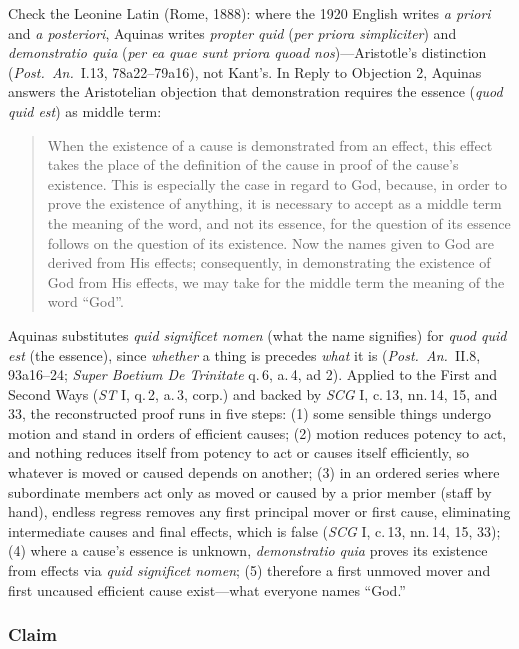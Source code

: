 Check the Leonine Latin (Rome, 1888): where the 1920 English writes \emph{a priori} and \emph{a posteriori}, Aquinas writes \emph{propter quid} (\emph{per priora simpliciter}) and \emph{demonstratio quia} (\emph{per ea quae sunt priora quoad nos})---Aristotle's distinction (\emph{Post.\ An.}\ I.13, 78a22--79a16), not Kant's. In Reply to Objection 2, Aquinas answers the Aristotelian objection that demonstration requires the essence (\emph{quod quid est}) as middle term:

\begin{quote}
When the existence of a cause is demonstrated from an effect, this effect takes the place of the definition of the cause in proof of the cause's existence. This is especially the case in regard to God, because, in order to prove the existence of anything, it is necessary to accept as a middle term the meaning of the word, and not its essence, for the question of its essence follows on the question of its existence. Now the names given to God are derived from His effects; consequently, in demonstrating the existence of God from His effects, we may take for the middle term the meaning of the word ``God''.
\end{quote}

Aquinas substitutes \emph{quid significet nomen} (what the name signifies) for \emph{quod quid est} (the essence), since \emph{whether} a thing is precedes \emph{what} it is (\emph{Post.\ An.}\ II.8, 93a16--24; \emph{Super Boetium De Trinitate} q.\,6, a.\,4, ad 2). Applied to the First and Second Ways (\emph{ST} I, q.\,2, a.\,3, corp.) and backed by \emph{SCG} I, c.\,13, nn.\,14, 15, and 33, the reconstructed proof runs in five steps: (1) some sensible things undergo motion and stand in orders of efficient causes; (2) motion reduces potency to act, and nothing reduces itself from potency to act or causes itself efficiently, so whatever is moved or caused depends on another; (3) in an ordered series where subordinate members act only as moved or caused by a prior member (staff by hand), endless regress removes any first principal mover or first cause, eliminating intermediate causes and final effects, which is false (\emph{SCG} I, c.\,13, nn.\,14, 15, 33); (4) where a cause's essence is unknown, \emph{demonstratio quia} proves its existence from effects via \emph{quid significet nomen}; (5) therefore a first unmoved mover and first uncaused efficient cause exist---what everyone names ``God.''

\subsubsection*{Claim}

